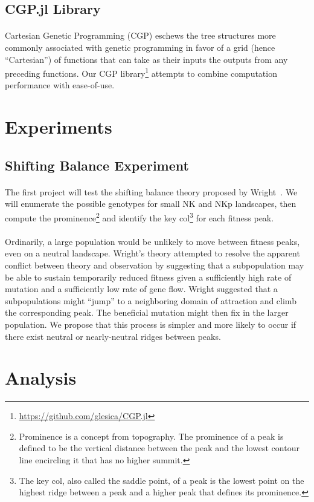 \documentclass[12pt,letterpaper,titlepage,draft]{article}
\begin{document}
\subsection{CGP.jl Library}

\paragraph{}
Cartesian Genetic Programming (CGP) eschews the tree structures more commonly
associated with genetic programming in favor of a grid (hence ``Cartesian'') of
functions that can take as their inputs the outputs from any preceding
functions. Our CGP library\footnote{\url{https://github.com/glesica/CGP.jl}}
attempts to combine computation performance with ease-of-use.

\section{Experiments}

\subsection{Shifting Balance Experiment}

\paragraph{}
The first project will test the shifting balance theory proposed by
Wright~\cite{Wright1982}\cite{Wright1931}. We will enumerate the possible
genotypes for small NK and NKp landscapes, then compute the
prominence\footnote{Prominence is a concept from topography. The prominence of
a peak is defined to be the vertical distance between the peak and the
lowest contour line encircling it that has no higher summit.} and identify the
key col\footnote{The key col, also called the saddle point, of a peak is the
lowest point on the highest ridge between a peak and a higher peak that
defines its prominence.} for each fitness peak.

\paragraph{}
Ordinarily, a large population would be unlikely to move between fitness peaks,
even on a neutral landscape. Wright's theory attempted to resolve the apparent
conflict between theory and observation by suggesting that a subpopulation may
be able to sustain temporarily reduced fitness given a sufficiently high rate
of mutation and a sufficiently low rate of gene flow. Wright suggested that a
subpopulations might ``jump'' to a neighboring domain of attraction and climb
the corresponding peak. The beneficial mutation might then fix in the larger
population. We propose that this process is simpler and more likely to occur if
there exist neutral or nearly-neutral ridges between peaks.

\section{Analysis}


{}
\end{document}
